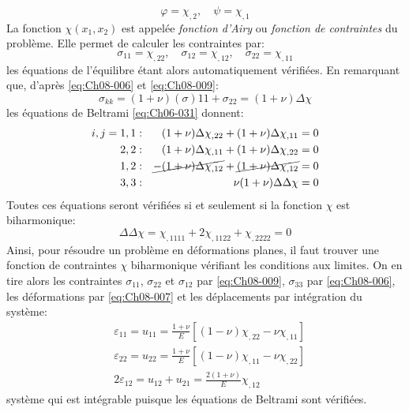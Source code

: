 \begin{equation*}
\varphi=\chi_{,2},\quad \psi=\chi_{,1}
\end{equation*}
La fonction $\chi(x_1,x_2)$ est appelée \emph{fonction d'Airy} ou \emph{fonction de contraintes} du problème. 
Elle permet de calculer les contraintes par: 
\begin{equation}
\sigma_{11}=\chi_{,22},\quad \sigma_{12}=\chi_{,12},\quad \sigma_{22}=\chi_{,11}
    \label{eq:Ch08-009}
\end{equation}
les équations de l'équilibre étant alors automatiquement vérifiées. 
En remarquant que, d'après \eqref{eq:Ch08-006} et \eqref{eq:Ch08-009}: 
\begin{equation}
\sigma_{kk}=(1+\nu)(\sigma){11}+\sigma_{22}=(1+\nu)\Delta\chi
\label{eq:Ch08-010}
\end{equation}
les équations de Beltrami \eqref{eq:Ch06-031} donnent: 
\begin{equation}
  \begin{aligned}
  i,j = 1,1 & : &  (1+\nu) \Delta\chi_{,22} + (1+\nu) \Delta\chi_{,11}=0 \\
        2,2 & : &  (1+\nu) \Delta\chi_{,11} + (1+\nu) \Delta\chi_{,22}=0 \\ 
        1,2 & : & \cancel{-(1+\nu) \Delta\chi_{,12}} + \cancel{(1+\nu) \Delta\chi_{,12}}=0 \\
        3,3 & : & \nu(1+\nu) \Delta\Delta\chi = 0 \\
  \end{aligned}
\label{eq:Ch08-011}
\end{equation}
Toutes ces équations seront vérifiées si et seulement si la fonction $\chi$ est biharmonique: 
\begin{equation}
\Delta\Delta\chi=\chi_{,1111}+2\chi_{,1122}+\chi_{,2222}=0
\label{eq:Ch08-012}
\end{equation}
Ainsi, pour résoudre un problème en déformations planes, il faut trouver une fonction de contraintes $\chi$ biharmonique vérifiant les conditions aux limites. 
On en tire alors les contraintes $\sigma_{11}$, $\sigma_{22}$ et $\sigma_{12}$ par \eqref{eq:Ch08-009}, $\sigma_{33}$ par \eqref{eq:Ch08-006}, les déformations par \eqref{eq:Ch08-007} et les déplacements par intégration du système: 
\begin{equation}
  \begin{aligned}
  &\varepsilon_{11}=u_{11}=\frac{1+\nu}{E}[(1-\nu)\chi_{,22}-\nu\chi_{,11}] \\
  &\varepsilon_{22}=u_{22}=\frac{1+\nu}{E}[(1-\nu)\chi_{,11}-\nu\chi_{,22}] \\
  &2\varepsilon_{12}=u_{12}+u_{21}=\frac{2(1+\nu)}{E}\chi_{,12}
  \end{aligned}
\label{eq:Ch08-013}
\end{equation}
système qui est intégrable puisque les équations de Beltrami sont vérifiées. 
